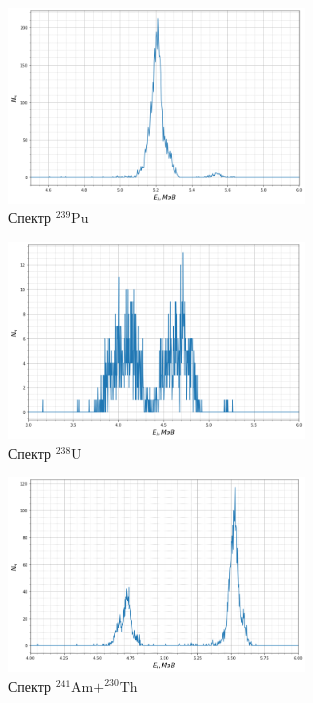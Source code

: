 \documentclass[11.5pt,a4paper,russian]{article}
\begin{document}
\begin{figure}[h!]
\centering
\includegraphics[width=0.7\textwidth]{44b70cf4-4b6c-48fa-825a-fe3d68087e3e}
\caption{Спектр ${ }^{239} \mathrm{Pu}$}
\end{figure}


\begin{figure}[h!]
\centering
\includegraphics[width=0.7\textwidth]{d85fc747-d9e2-4576-84f2-54f3d4065373}
\caption{Спектр ${ }^{238} \mathrm{U}$}
\end{figure}

\begin{figure}[h!]
\centering
\includegraphics[width=0.7\textwidth]{5f5f271d-9b7a-45db-9c74-f1768a235b47}
\caption{Спектр ${ }^{241} \mathrm{Am} + ^{230} \mathrm{Th}$}
\end{figure}
\end{document}
